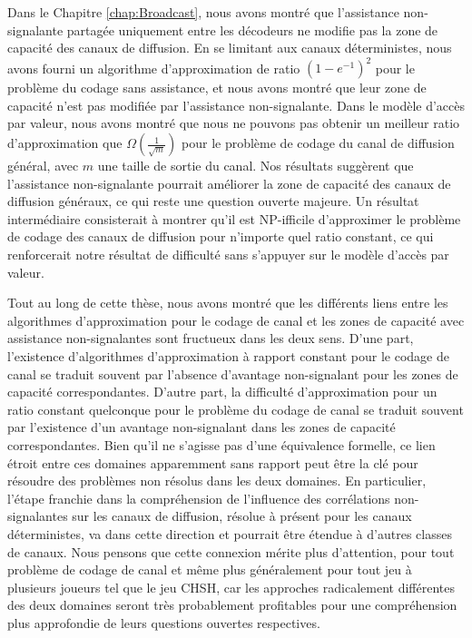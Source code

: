 Dans le Chapitre \ref{chap:Broadcast}, nous avons montré que l'assistance non-signalante partagée uniquement entre les décodeurs ne modifie pas la zone de capacité des canaux de diffusion. En se limitant aux canaux déterministes, nous avons fourni un algorithme d'approximation de ratio $(1-e^{-1})^2$ pour le problème du codage sans assistance, et nous avons montré que leur zone de capacité n'est pas modifiée par l'assistance non-signalante. Dans le modèle d'accès par valeur, nous avons montré que nous ne pouvons pas obtenir un meilleur ratio d'approximation que $\Omega\left(\frac{1}{\sqrt{m}}\right)$ pour le problème de codage du canal de diffusion général, avec $m$ une taille de sortie du canal. Nos résultats suggèrent que l'assistance non-signalante pourrait améliorer la zone de capacité des canaux de diffusion généraux, ce qui reste une question ouverte majeure. Un résultat intermédiaire consisterait à montrer qu'il est \textrm{NP}-ifficile d'approximer le problème de codage des canaux de diffusion pour n'importe quel ratio constant, ce qui renforcerait notre résultat de difficulté sans s'appuyer sur le modèle d'accès par valeur.

Tout au long de cette thèse, nous avons montré que les différents liens entre les algorithmes d'approximation pour le codage de canal et les zones de capacité avec assistance non-signalantes sont fructueux dans les deux sens. D'une part, l'existence d'algorithmes d'approximation à rapport constant pour le codage de canal se traduit souvent par l'absence d'avantage non-signalant pour les zones de capacité correspondantes. D'autre part, la difficulté d'approximation pour un ratio constant quelconque pour le problème du codage de canal se traduit souvent par l'existence d'un avantage non-signalant dans les zones de capacité correspondantes. Bien qu'il ne s'agisse pas d'une équivalence formelle, ce lien étroit entre ces domaines apparemment sans rapport peut être la clé pour résoudre des problèmes non résolus dans les deux domaines. En particulier, l'étape franchie dans la compréhension de l'influence des corrélations non-signalantes sur les canaux de diffusion, résolue à présent pour les canaux déterministes, va dans cette direction et pourrait être étendue à d'autres classes de canaux. Nous pensons que cette connexion mérite plus d'attention, pour tout problème de codage de canal et même plus généralement pour tout jeu à plusieurs joueurs tel que le jeu CHSH, car les approches radicalement différentes des deux domaines seront très probablement profitables pour une compréhension plus approfondie de leurs questions ouvertes respectives.
